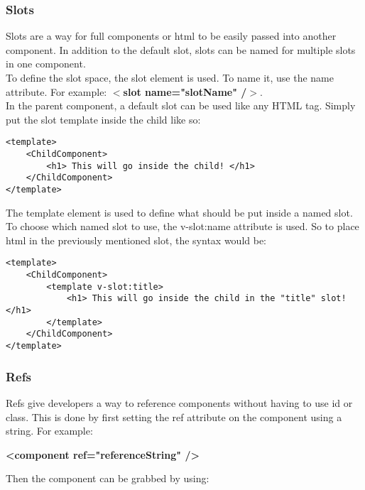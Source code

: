 \documentclass[portfolio.tex]{subfiles}
\begin{document}
				\subsubsection{Slots}
					\label{slots}
					Slots are a way for full components or html to be easily passed into another component. In addition to the default slot, slots can be named for multiple slots in one component. \\

					To define the slot space, the slot element is used. To name it, use the name attribute. For example: \textbf{$<$slot name="slotName" /$>$}.\\

					In the parent component, a default slot can be used like any HTML tag. Simply put the slot template inside the child like so:\\

					\begin{lstlisting}
<template>
	<ChildComponent>
		<h1> This will go inside the child! </h1>
	</ChildComponent>
</template>
					\end{lstlisting}

					\bigbreak
					The template element is used to define what should be put inside a named slot. To choose which named slot to use, the v-slot:name attribute is used. So to place html in the previously mentioned slot, the syntax would be:\\

					\begin{lstlisting}
<template>
	<ChildComponent>
		<template v-slot:title>
			<h1> This will go inside the child in the "title" slot!</h1>
		</template>
	</ChildComponent>
</template>
					\end{lstlisting}



				\subsubsection{Refs}
					Refs give developers a way to reference components without having to use id or class. This is done by first setting the ref attribute on the component using a string. For example:
					\begin{center}
						\textbf{<component ref="referenceString" />}\\
					\end{center}


					\noindent Then the component can be grabbed by using:
\end{document}
